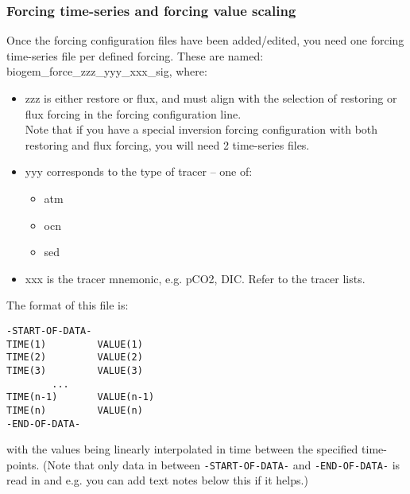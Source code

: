 \newpage
%

\subsubsection*{Forcing time-series and forcing value scaling}

\vspace{1mm}

Once the forcing configuration files have been added/edited, you need one forcing time-series file per defined forcing. These are named: \textsf{\footnotesize biogem\_force\_zzz\_yyy\_xxx\_sig}, where:
\vspace{1mm}
\begin{itemize}[noitemsep]
\item \textsf{\footnotesize zzz} is either \textsf{\footnotesize restore} or \textsf{\footnotesize flux}, and must align with the selection of restoring or flux forcing in the forcing configuration line.
\\Note that if you have a special inversion forcing configuration with both restoring and flux forcing, you will need 2 time-series files.
\item \textsf{\footnotesize yyy} corresponds to the type of tracer -- one of:
\begin{itemize}[noitemsep]
\item \textsf{\footnotesize atm}
\item \textsf{\footnotesize ocn}
\item \textsf{\footnotesize sed}
\end{itemize}
\item \textsf{\footnotesize xxx} is the tracer mnemonic, e.g. \textsf{\footnotesize pCO2}, \textsf{\footnotesize DIC}. Refer to the tracer lists.
\end{itemize}

\vspace{2mm}

\noindent The format of this file is:
\vspace{-2mm}\footnotesize\begin{verbatim}
-START-OF-DATA-
TIME(1)         VALUE(1)
TIME(2)         VALUE(2)
TIME(3)         VALUE(3)
        ...
TIME(n-1)       VALUE(n-1)
TIME(n)         VALUE(n)
-END-OF-DATA-
\end{verbatim}\normalsize\vspace{-2mm}
with the values being linearly interpolated in time between the specified time-points. (Note that only data in between \texttt{\small -START-OF-DATA-} and \texttt{\small -END-OF-DATA-} is read in and e.g. you can add text notes below this if it helps.)

